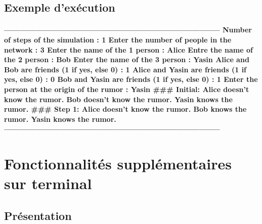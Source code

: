 \documentclass[a4paper,11pt]{article}
\begin{document}
\subsection{Exemple d'exécution}
\paragraph
{--------------------------------------------------------------------------------
\newline Number of steps of the simulation : \textbf{1}
\newline Enter the number of people in the network : \textbf{3}
\newline Enter the name of the 1 person : \textbf{Alice}
\newline Entre the name of the 2 person : \textbf{Bob}
\newline Enter the name of the 3 person : \textbf{Yasin}
\newline Alice and Bob are friends (1 if yes, else 0) : \textbf{1}
\newline Alice and Yasin are friends (1 if yes, else 0) : \textbf{0}
\newline Bob and Yasin are friends (1 if yes, else 0) : \textbf{1}
\newline Enter the person at the origin of the rumor : \textbf{Yasin}
\newline \#\#\#
\newline Initial:
\newline Alice doesn't know the rumor.
\newline Bob doesn't know the rumor.
\newline Yasin knows the rumor.
\newline \#\#\#
\newline Step 1:
\newline Alice doesn't know the rumor.
\newline Bob knows the rumor.
\newline Yasin knows the rumor.
\newline --------------------------------------------------------------------------------}

\section{Fonctionnalités supplémentaires sur terminal}
\subsection{Présentation}
\end{document}
